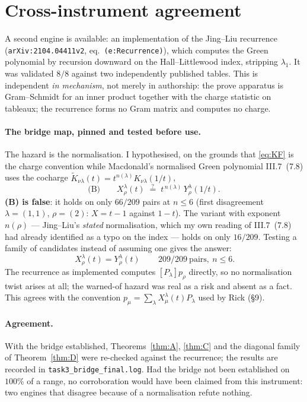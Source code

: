 \documentclass[11pt]{article}
\theoremstyle{plain}
\theoremstyle{definition}
\newcommand{\lam}{\lambda}
\begin{document}
\section{Cross-instrument agreement}

A second engine is available: an implementation of the Jing--Liu recurrence
(\texttt{arXiv:2104.04411v2}, eq.~\texttt{(e:Recurrence)}), which computes the Green polynomial
by recursion downward on the Hall--Littlewood index, stripping $\lam_1$. It was validated $8/8$
against two independently published tables. This is independent \emph{in mechanism}, not merely
in authorship: the prove apparatus is Gram--Schmidt for an inner product together with the
charge statistic on tableaux; the recurrence forms no Gram matrix and computes no charge.

\paragraph{The bridge map, pinned and tested before use.} The hazard is the normalisation. I
hypothesised, on the grounds that \eqref{eq:KF} is the charge convention while Macdonald's
normalised Green polynomial III.7~(7.8) uses the cocharge
$\widetilde K_{\nu\lam}(t)=t^{n(\lam)}K_{\nu\lam}(1/t)$,
\[
  \text{(B)}\qquad X^{\lam}_{\rho}(t)\;\overset{?}{=}\;t^{\,n(\lam)}\,Y^{\lam}_{\rho}(1/t).
\]
\textbf{(B) is false}: it holds on only $66/209$ pairs at $n\le 6$ (first disagreement
$\lam=(1,1)$, $\rho=(2)$: $X=t-1$ against $1-t$). The variant with exponent $n(\rho)$ ---
Jing--Liu's \emph{stated} normalisation, which my own reading of III.7~(7.8) had already
identified as a typo on the index --- holds on only $16/209$. Testing a family of candidates
instead of assuming one gives the answer:
\[
  \boxed{\,X^{\lam}_{\rho}(t)=Y^{\lam}_{\rho}(t)\,}\qquad 209/209\ \text{pairs},\ n\le 6 .
\]
The recurrence as implemented computes $[P_\lam]p_\rho$ directly, so no normalisation twist
arises at all; the warned-of hazard was real as a risk and absent as a fact. This agrees with the
convention $p_\mu=\sum_\lam X^{\lam}_\mu(t)P_\lam$ used by Rick (\S9).

\paragraph{Agreement.} With the bridge established, Theorems~\ref{thm:A}, \ref{thm:C} and the
diagonal family of Theorem~\ref{thm:D} were re-checked against the recurrence; the results are
recorded in \texttt{task3\_bridge\_final.log}. Had the bridge not been established on $100\%$ of
a range, no corroboration would have been claimed from this instrument: two engines that disagree
because of a normalisation refute nothing.
\end{document}
